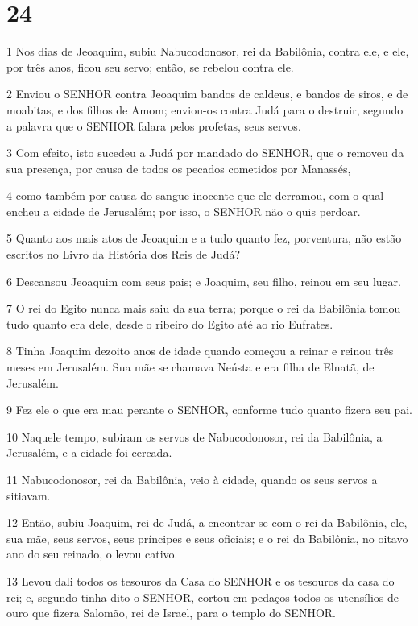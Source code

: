 \chapter{24}

\par 1 Nos dias de Jeoaquim, subiu Nabucodonosor, rei da Babilônia, contra ele, e ele, por três anos, ficou seu servo; então, se rebelou contra ele.
\par 2 Enviou o SENHOR contra Jeoaquim bandos de caldeus, e bandos de siros, e de moabitas, e dos filhos de Amom; enviou-os contra Judá para o destruir, segundo a palavra que o SENHOR falara pelos profetas, seus servos.
\par 3 Com efeito, isto sucedeu a Judá por mandado do SENHOR, que o removeu da sua presença, por causa de todos os pecados cometidos por Manassés,
\par 4 como também por causa do sangue inocente que ele derramou, com o qual encheu a cidade de Jerusalém; por isso, o SENHOR não o quis perdoar.
\par 5 Quanto aos mais atos de Jeoaquim e a tudo quanto fez, porventura, não estão escritos no Livro da História dos Reis de Judá?
\par 6 Descansou Jeoaquim com seus pais; e Joaquim, seu filho, reinou em seu lugar.
\par 7 O rei do Egito nunca mais saiu da sua terra; porque o rei da Babilônia tomou tudo quanto era dele, desde o ribeiro do Egito até ao rio Eufrates.
\par 8 Tinha Joaquim dezoito anos de idade quando começou a reinar e reinou três meses em Jerusalém. Sua mãe se chamava Neústa e era filha de Elnatã, de Jerusalém.
\par 9 Fez ele o que era mau perante o SENHOR, conforme tudo quanto fizera seu pai.
\par 10 Naquele tempo, subiram os servos de Nabucodonosor, rei da Babilônia, a Jerusalém, e a cidade foi cercada.
\par 11 Nabucodonosor, rei da Babilônia, veio à cidade, quando os seus servos a sitiavam.
\par 12 Então, subiu Joaquim, rei de Judá, a encontrar-se com o rei da Babilônia, ele, sua mãe, seus servos, seus príncipes e seus oficiais; e o rei da Babilônia, no oitavo ano do seu reinado, o levou cativo.
\par 13 Levou dali todos os tesouros da Casa do SENHOR e os tesouros da casa do rei; e, segundo tinha dito o SENHOR, cortou em pedaços todos os utensílios de ouro que fizera Salomão, rei de Israel, para o templo do SENHOR.
